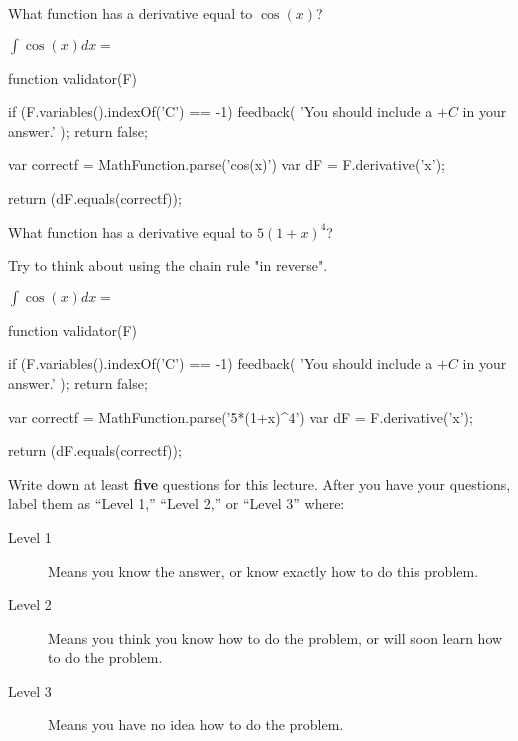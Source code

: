 \documentclass{ximera}
\begin{document}
\begin{question}
	\begin{hint}
		What function has a derivative equal to $\cos(x)$?
	\end{hint}
 	$\displaystyle \int \cos(x) dx = $ 
	\begin{expression-answer}
 function validator(F) {
   if (F.variables().indexOf('C') == -1) {
     feedback( 'You should include a $+C$ in your answer.' );
     return false;
   }
   
   var correctf = MathFunction.parse('cos(x)')
   var dF = F.derivative('x');
   
   return (dF.equals(correctf));
 }
\end{expression-answer}	
	
\end{question}

\begin{question}
	\begin{hint}
		What function has a derivative equal to $5(1+x)^4$?
	\end{hint}
	\begin{hint}
		Try to think about using the chain rule "in reverse".
	\end{hint}
 	$\displaystyle \int \cos(x) dx = $ 
	\begin{expression-answer}
 function validator(F) {
   if (F.variables().indexOf('C') == -1) {
     feedback( 'You should include a $+C$ in your answer.' );
     return false;
   }
   
   var correctf = MathFunction.parse('5*(1+x)^4')
   var dF = F.derivative('x');
   
   return (dF.equals(correctf));
 }
\end{expression-answer}	
	
\end{question}


\begin{question}
Write down at least \textbf{five} questions for this lecture. After
you have your questions, label them as ``Level 1,'' ``Level 2,'' or ``Level 3'' where:
\begin{description}
\item[Level 1] Means you know the answer, or know exactly how to do this problem.
\item[Level 2] Means you think you know how to do the problem, or will soon learn how to do the problem.
\item[Level 3] Means you have no idea how to do the problem. 
\end{description}
\begin{freeResponse}
\end{freeResponse}
\end{question}
\end{document}
